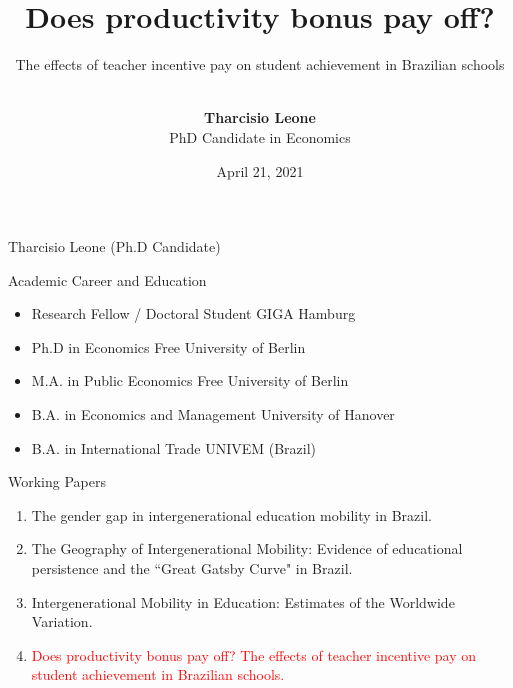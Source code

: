 \documentclass{beamer}
\title[Does productivity bonus pay off?]{Does productivity bonus pay off?}
\subtitle{\footnotesize The effects of teacher incentive pay on student achievement in Brazilian schools}
\author [Tharcisio Leone]{ \\ \textbf {Tharcisio Leone} \\ \footnotesize PhD Candidate in Economics}
\institute[GIGA/FU-Berlin] 
{ \\ Dissertation Defense \\ Freie Universität Berlin
    }
\date[\\ April 21, 2021]{\footnotesize April 21, 2021}
\begin{document}
\begin{frame}
  \titlepage
\end{frame}



\begin{frame} {Tharcisio Leone (Ph.D Candidate)}
\begin{block}{\centering Academic Career and Education}
\begin{itemize}
\item \footnotesize Research Fellow / Doctoral Student \hspace{1,8cm} GIGA Hamburg
\item \footnotesize Ph.D in Economics \hspace{4.1cm} Free University of Berlin
\item \footnotesize M.A. in Public Economics \hspace{3,15cm} Free University of Berlin
\item \footnotesize B.A. in Economics and Management\hspace{1.79cm} University of Hanover
\item \footnotesize B.A. in International Trade	\hspace{3cm} UNIVEM (Brazil)
\end{itemize}
\end{block}


\begin{block}{\centering Working Papers}
\begin{enumerate}
\item \footnotesize The gender gap in intergenerational education mobility in Brazil.
\item \footnotesize The Geography of Intergenerational Mobility: Evidence of educational persistence and the ``Great Gatsby Curve" in Brazil.
\item \footnotesize Intergenerational Mobility in Education: Estimates of the Worldwide Variation.
\item \footnotesize \textcolor{red}{Does productivity bonus pay off? The effects of teacher incentive pay on student achievement in Brazilian schools.}
\end{enumerate}
\end{block}
\end{frame}
\end{document}
